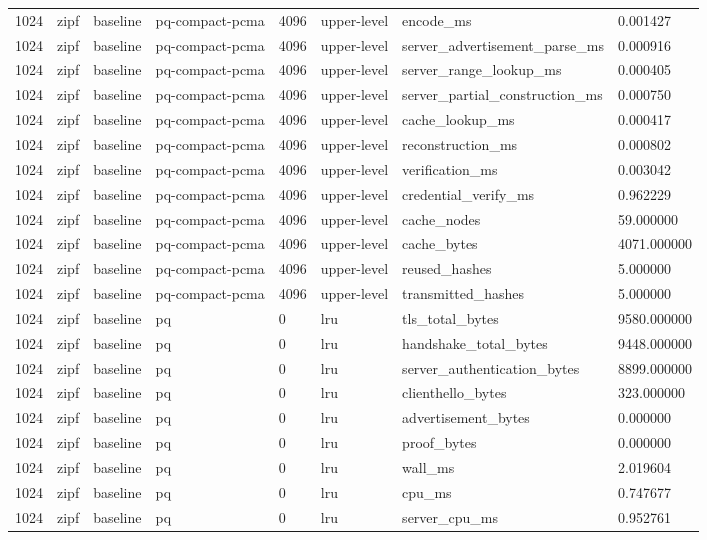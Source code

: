 \begin{tabular}{llllllll}
1024 & zipf & baseline & pq-compact-pcma & 4096 & upper-level & encode\_ms & 0.001427 \\
1024 & zipf & baseline & pq-compact-pcma & 4096 & upper-level & server\_advertisement\_parse\_ms & 0.000916 \\
1024 & zipf & baseline & pq-compact-pcma & 4096 & upper-level & server\_range\_lookup\_ms & 0.000405 \\
1024 & zipf & baseline & pq-compact-pcma & 4096 & upper-level & server\_partial\_construction\_ms & 0.000750 \\
1024 & zipf & baseline & pq-compact-pcma & 4096 & upper-level & cache\_lookup\_ms & 0.000417 \\
1024 & zipf & baseline & pq-compact-pcma & 4096 & upper-level & reconstruction\_ms & 0.000802 \\
1024 & zipf & baseline & pq-compact-pcma & 4096 & upper-level & verification\_ms & 0.003042 \\
1024 & zipf & baseline & pq-compact-pcma & 4096 & upper-level & credential\_verify\_ms & 0.962229 \\
1024 & zipf & baseline & pq-compact-pcma & 4096 & upper-level & cache\_nodes & 59.000000 \\
1024 & zipf & baseline & pq-compact-pcma & 4096 & upper-level & cache\_bytes & 4071.000000 \\
1024 & zipf & baseline & pq-compact-pcma & 4096 & upper-level & reused\_hashes & 5.000000 \\
1024 & zipf & baseline & pq-compact-pcma & 4096 & upper-level & transmitted\_hashes & 5.000000 \\
1024 & zipf & baseline & pq & 0 & lru & tls\_total\_bytes & 9580.000000 \\
1024 & zipf & baseline & pq & 0 & lru & handshake\_total\_bytes & 9448.000000 \\
1024 & zipf & baseline & pq & 0 & lru & server\_authentication\_bytes & 8899.000000 \\
1024 & zipf & baseline & pq & 0 & lru & clienthello\_bytes & 323.000000 \\
1024 & zipf & baseline & pq & 0 & lru & advertisement\_bytes & 0.000000 \\
1024 & zipf & baseline & pq & 0 & lru & proof\_bytes & 0.000000 \\
1024 & zipf & baseline & pq & 0 & lru & wall\_ms & 2.019604 \\
1024 & zipf & baseline & pq & 0 & lru & cpu\_ms & 0.747677 \\
1024 & zipf & baseline & pq & 0 & lru & server\_cpu\_ms & 0.952761 \\

\end{tabular}
